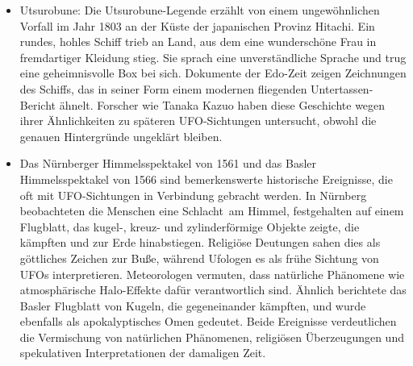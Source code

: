 \documentclass{scrartcl}
\begin{document}
\begin{itemize}
	\item Utsurobune: Die Utsurobune-Legende erzählt von einem ungewöhnlichen Vorfall im Jahr 1803 an der Küste der japanischen Provinz Hitachi. Ein rundes, hohles Schiff trieb an Land, aus dem eine wunderschöne Frau in fremdartiger Kleidung stieg. Sie sprach eine unverständliche Sprache und trug eine geheimnisvolle Box bei sich. Dokumente der Edo-Zeit zeigen Zeichnungen des Schiffs, das in seiner Form einem modernen \frq fliegenden Untertassen\flq-Bericht ähnelt. Forscher wie Tanaka Kazuo haben diese Geschichte wegen ihrer Ähnlichkeiten zu späteren UFO-Sichtungen untersucht, obwohl die genauen Hintergründe ungeklärt bleiben. 
	\item Das Nürnberger Himmelsspektakel von 1561 und das Basler Himmelsspektakel von 1566 sind bemerkenswerte historische Ereignisse, die oft mit UFO-Sichtungen in Verbindung gebracht werden. In Nürnberg beobachteten die Menschen eine \frq Schlacht\flq\ am Himmel, festgehalten auf einem Flugblatt, das kugel-, kreuz- und zylinderförmige Objekte zeigte, die kämpften und zur Erde hinabstiegen. Religiöse Deutungen sahen dies als göttliches Zeichen zur Buße, während Ufologen es als frühe Sichtung von UFOs interpretieren. Meteorologen vermuten, dass natürliche Phänomene wie atmosphärische Halo-Effekte dafür verantwortlich sind. Ähnlich berichtete das Basler Flugblatt von Kugeln, die gegeneinander \frq kämpften\flq, und wurde ebenfalls als apokalyptisches Omen gedeutet. Beide Ereignisse verdeutlichen die Vermischung von natürlichen Phänomenen, religiösen Überzeugungen und spekulativen Interpretationen der damaligen Zeit.


\end{itemize}
\end{document}

